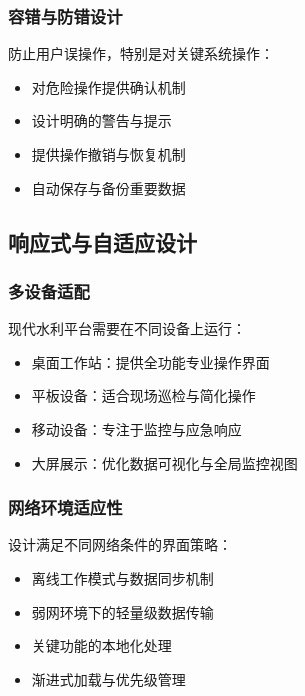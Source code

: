 \subsubsection{容错与防错设计}\label{ux5bb9ux9519ux4e0eux9632ux9519ux8bbeux8ba1}

防止用户误操作，特别是对关键系统操作：

\begin{itemize}
\tightlist
\item
  对危险操作提供确认机制
\item
  设计明确的警告与提示
\item
  提供操作撤销与恢复机制
\item
  自动保存与备份重要数据
\end{itemize}

\subsection{响应式与自适应设计}\label{ux54cdux5e94ux5f0fux4e0eux81eaux9002ux5e94ux8bbeux8ba1}

\subsubsection{多设备适配}\label{ux591aux8bbeux5907ux9002ux914d}

现代水利平台需要在不同设备上运行：

\begin{itemize}
\tightlist
\item
  桌面工作站：提供全功能专业操作界面
\item
  平板设备：适合现场巡检与简化操作
\item
  移动设备：专注于监控与应急响应
\item
  大屏展示：优化数据可视化与全局监控视图
\end{itemize}

\subsubsection{网络环境适应性}\label{ux7f51ux7edcux73afux5883ux9002ux5e94ux6027}

设计满足不同网络条件的界面策略：

\begin{itemize}
\tightlist
\item
  离线工作模式与数据同步机制
\item
  弱网环境下的轻量级数据传输
\item
  关键功能的本地化处理
\item
  渐进式加载与优先级管理
\end{itemize}

